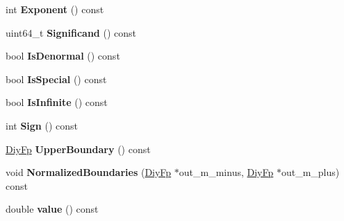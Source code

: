 \begin{DoxyCompactItemize}
\item 
int {\bfseries Exponent} () const \hypertarget{classv8_1_1internal_1_1_double_ab9695306713296276c93561af462b7d3}{}\label{classv8_1_1internal_1_1_double_ab9695306713296276c93561af462b7d3}

\item 
uint64\+\_\+t {\bfseries Significand} () const \hypertarget{classv8_1_1internal_1_1_double_aab2ba17924404388a43b18356fb96cd8}{}\label{classv8_1_1internal_1_1_double_aab2ba17924404388a43b18356fb96cd8}

\item 
bool {\bfseries Is\+Denormal} () const \hypertarget{classv8_1_1internal_1_1_double_a2bd3977ee8b66067a0f6724643f18268}{}\label{classv8_1_1internal_1_1_double_a2bd3977ee8b66067a0f6724643f18268}

\item 
bool {\bfseries Is\+Special} () const \hypertarget{classv8_1_1internal_1_1_double_a75c994211c852906f1fe88772fc271ac}{}\label{classv8_1_1internal_1_1_double_a75c994211c852906f1fe88772fc271ac}

\item 
bool {\bfseries Is\+Infinite} () const \hypertarget{classv8_1_1internal_1_1_double_a4614a72d0bdc52f54b25246449f86496}{}\label{classv8_1_1internal_1_1_double_a4614a72d0bdc52f54b25246449f86496}

\item 
int {\bfseries Sign} () const \hypertarget{classv8_1_1internal_1_1_double_ac72f0af8be136a54328315083cdf4314}{}\label{classv8_1_1internal_1_1_double_ac72f0af8be136a54328315083cdf4314}

\item 
\hyperlink{classv8_1_1internal_1_1_diy_fp}{Diy\+Fp} {\bfseries Upper\+Boundary} () const \hypertarget{classv8_1_1internal_1_1_double_a29e22dbcea8dc7c99c5c0e7c3423eca7}{}\label{classv8_1_1internal_1_1_double_a29e22dbcea8dc7c99c5c0e7c3423eca7}

\item 
void {\bfseries Normalized\+Boundaries} (\hyperlink{classv8_1_1internal_1_1_diy_fp}{Diy\+Fp} $\ast$out\+\_\+m\+\_\+minus, \hyperlink{classv8_1_1internal_1_1_diy_fp}{Diy\+Fp} $\ast$out\+\_\+m\+\_\+plus) const \hypertarget{classv8_1_1internal_1_1_double_a210b004181bc1b4aa2251676888ef3a8}{}\label{classv8_1_1internal_1_1_double_a210b004181bc1b4aa2251676888ef3a8}

\item 
double {\bfseries value} () const \hypertarget{classv8_1_1internal_1_1_double_ac46d9514c6833c1c8ebd51aa354b05cf}{}\label{classv8_1_1internal_1_1_double_ac46d9514c6833c1c8ebd51aa354b05cf}

\end{DoxyCompactItemize}
